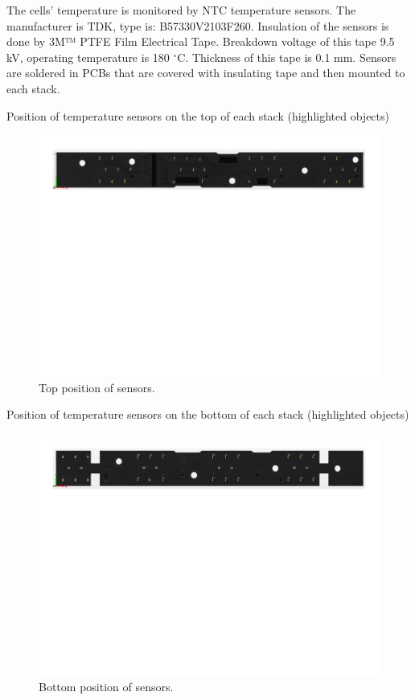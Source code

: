 The cells’ temperature is monitored by NTC temperature sensors. The manufacturer is TDK, type is: B57330V2103F260. Insulation of the sensors is done by 3M™ PTFE Film Electrical Tape. Breakdown voltage of this tape 9.5 kV, operating temperature is 180 $^\circ$C. Thickness of this tape is 0.1 mm. Sensors are soldered in PCBs that are covered with insulating tape and then mounted to each stack. 

Position of temperature sensors on the top of each stack (highlighted objects)
\begin{figure}[H]
	\centering
	\includegraphics[width=\textwidth,trim={0cm 16cm 0cm 0cm}, clip]{./img/BMS-top-sensors.pdf}
	\caption{Top position of sensors.}
	\label{fig:BMS-top}
\end{figure}
Position of temperature sensors on the bottom of each stack (highlighted objects)
\begin{figure}[H]
	\centering
	\includegraphics[width=\textwidth,trim={0cm 16cm 0cm 0cm}, clip]{./img/BMS-bottom-sensors.pdf}
	\caption{Bottom position of sensors.}
	\label{fig:bms-bottom}
\end{figure}
